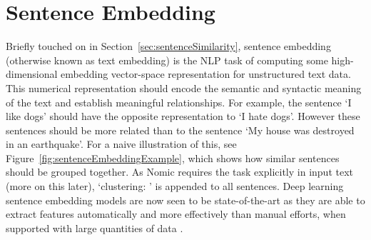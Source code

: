 \documentclass[10pt,oneside]{report}
\begin{document}

\section{Sentence Embedding}\label{sec:sentenceEmbedding}
Briefly touched on in Section~\ref{sec:sentenceSimilarity}, sentence embedding (otherwise known as text embedding) is the NLP task of computing some high-dimensional embedding vector-space representation for unstructured text data. This numerical representation should encode the semantic and syntactic meaning of the text and establish meaningful relationships. For example, the sentence `I like dogs' should have the opposite representation to `I hate dogs'.  However these sentences should be more related than to the sentence `My house was destroyed in an earthquake'. For a naive illustration of this, see Figure~\ref{fig:sentenceEmbeddingExample}, which shows how similar sentences should be grouped together. As Nomic requires the task explicitly in input text (more on this later), `clustering: ' is appended to all sentences. Deep learning sentence embedding models are now seen to be state-of-the-art as they are able to extract features automatically and more effectively than manual efforts, when supported with large quantities of data \cite{liang2017text}.
\end{document}
